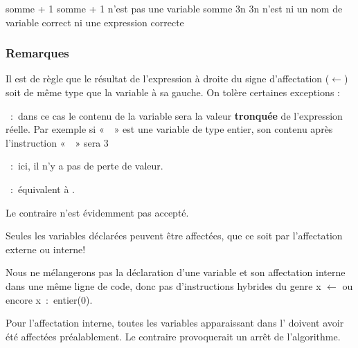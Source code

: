 			\begin{Pseudocode}
			\Let somme + 1 
			\RComment somme + 1 n’est pas une variable
			\Let somme \Gets 3n
			\RComment 3n n’est ni un nom de variable correct ni une expression correcte
			\end{Pseudocode}
			
			\subsubsection*{Remarques}

			\begin{liste}
			\item
				Il est de règle que le résultat de l’expression à droite du signe
				d’affectation ($\gets$) soit de
				même type que la variable à sa gauche. On tolère certaines exceptions
				:
				\begin{liste}
				\item
					~:~dans ce cas le contenu de la variable sera 
                    la valeur \textbf{tronquée} de l’expression réelle. 
					Par exemple si «~~» est
					une variable de type entier, son contenu après l’instruction
					«~~» 
					sera 3
				\item 
					~:~ici, il n’y a pas de perte de valeur.
				\item 
					~:~équivalent à 
                    .
					
					Le contraire n’est évidemment pas accepté.
				\end{liste}
			\item 
				Seules les variables déclarées peuvent être affectées, que ce soit par
				l’affectation externe ou interne!
			\item 
				Nous ne mélangerons pas la déclaration d’une variable et son
				affectation interne dans une même ligne de code, donc pas
				d’instructions hybrides du genre 
				\textsf{x}{ $\gets$ } ou encore 
				\textsf{x~:~entier(0)}.
			\item 
				Pour l’affectation interne, toutes les variables apparaissant dans
				l’ doivent avoir été affectées
				préalablement. Le contraire provoquerait un arrêt de l’algorithme.
			\end{liste}
			
